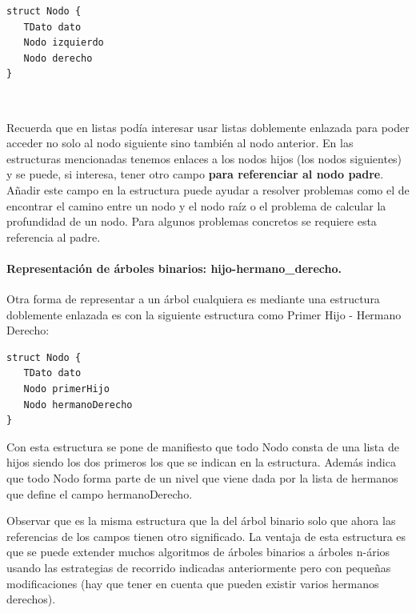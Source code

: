 \hfil
\begin{minipage}{.4\textwidth}
\begin{Verbatim}[frame=single]
struct Nodo {
   TDato dato
   Nodo izquierdo
   Nodo derecho 
}
\end{Verbatim}
\end{minipage}


\

Recuerda que en listas podía interesar usar listas doblemente enlazada  para poder acceder no solo al nodo siguiente sino también al nodo anterior. En las estructuras mencionadas tenemos enlaces a los nodos hijos (los nodos siguientes) y se puede, si interesa,  tener otro campo \textbf{para referenciar al nodo padre}. Añadir este campo en la estructura puede ayudar a resolver problemas como el de encontrar el camino entre un nodo y el nodo raíz o el problema de calcular la profundidad de un nodo. Para algunos problemas concretos se requiere esta referencia al padre.


\paragraph{Representación de árboles binarios: hijo-hermano\_derecho.}

Otra forma de representar a un árbol cualquiera es mediante una estructura doblemente enlazada es con la siguiente estructura como Primer Hijo - Hermano Derecho:

\hfil
\begin{minipage}{.4\textwidth}
\begin{Verbatim}[frame=single]
struct Nodo {
   TDato dato
   Nodo primerHijo
   Nodo hermanoDerecho 
}
\end{Verbatim}
\end{minipage}

Con esta estructura se pone de manifiesto que todo Nodo consta de una lista de hijos siendo los dos primeros los que se indican en la estructura. Además indica que todo Nodo forma parte de un nivel que viene dada por la lista de hermanos que define el campo hermanoDerecho.

Observar que es la misma estructura que la del árbol binario solo que ahora las referencias de los campos tienen otro significado. La ventaja de esta estructura es que se puede extender muchos algoritmos de árboles binarios a árboles n-ários usando las estrategias de recorrido indicadas anteriormente pero con pequeñas modificaciones (hay que tener en cuenta que pueden existir varios hermanos derechos).

